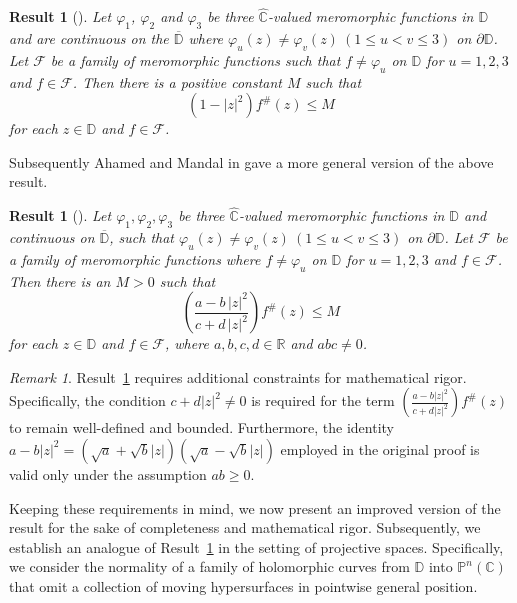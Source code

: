 \documentclass[11pt, reqno]{amsart}
\newtheorem{Result}[theorem]{Result}
\theoremstyle{definition}
\theoremstyle{remark}
\newtheorem{remark}[theorem]{Remark}
\numberwithin{equation}{section}
\begin{document}
\begin{Result}[{\cite[Theorem 1.1]{yang-anotacfnf-2020}}] \label{R-Yang_AC} 
Let $\varphi_1$, $\varphi_2$ and $\varphi_3$ be three $\widehat{\mathbb C}$-valued meromorphic functions in 
$\mathbb D$ and are continuous on the $\overline{\mathbb D}$ where $\varphi_u(z)\neq\varphi_v(z)\ (1 \leq u < v \leq 3)$ on 
$\partial\mathbb D$. Let $\mathcal F$ be a family of meromorphic 
functions such that $f\neq\varphi_u$ on $\mathbb D$ for $u=1,2,3$ 
and $f\in\mathcal F$. 
Then there is a positive constant $M$ such that $$(1-|z|^2)f^\#(z)\leq M$$
for each $z\in\mathbb D$ and $f\in\mathcal F$.
\end{Result}
Subsequently Ahamed and Mandal in \cite{ahamed-cponmanhm-2023} gave 
a more general version of the above result. 
\begin{Result}[{\cite[Theorem 2.1]{ahamed-cponmanhm-2023}}] \label{R-Ahamed_Mandal_AC} 
Let $\varphi_1,\varphi_2,\varphi_3$ be three $\widehat{\mathbb C}$-valued meromorphic functions in $\mathbb D$ and continuous 
on $\overline{\mathbb D}$, such that $\varphi_u(z)\neq\varphi_v(z)\ (1 \leq u < v \leq 3)$ on $\partial\mathbb D$. 
Let $\mathcal F$ be a family of meromorphic functions where $f\neq\varphi_u$ on $\mathbb D$ for $u=1,2,3$ and $f\in\mathcal F$.
Then there is an $M>0$ such that $$\left(\frac{a-b\,|z|^2}{c+d\,|z|^2}\right)f^\#(z)\leq M$$ for each $z\in \mathbb D$ and $f\in\mathcal F$, where $a,b,c,d\in \mathbb R$ and $abc\neq0$.
\end{Result}

\begin{remark}
Result~\ref{R-Ahamed_Mandal_AC} requires additional constraints for mathematical rigor. Specifically, the condition $c + d|z|^2 \neq 0$ is required for the term $\left(\frac{a-b|z|^2}{c+d|z|^2}\right)f^\#(z)$ to remain well-defined and bounded. Furthermore, the identity $a - b|z|^2 = (\sqrt{a} + \sqrt{b}|z|)(\sqrt{a} - \sqrt{b}|z|)$ employed in the original proof is valid only under the assumption $ab \geq 0$. 
\end{remark} 

Keeping these requirements in mind, we now present an improved 
version of the result for the sake of completeness and mathematical 
rigor. Subsequently, we establish an analogue of 
Result~\ref{R-Ahamed_Mandal_AC} in the setting of projective 
spaces. Specifically, we consider the normality of a family of 
holomorphic curves from $\mathbb{D}$ into 
$\mathbb{P}^n(\mathbb{C})$ that omit a collection of moving 
hypersurfaces in pointwise general position.
\end{document}
